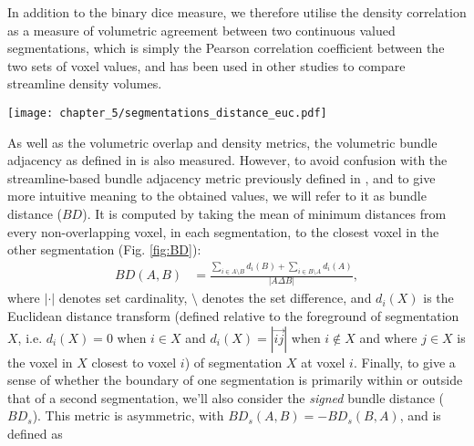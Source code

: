In addition to the binary \gls{dice} measure, we therefore utilise the density correlation as a measure of volumetric agreement between two continuous valued segmentations, which is simply the Pearson correlation coefficient between the two sets of voxel values, and has been used in other studies to compare streamline density volumes\autocite{Radwan2022, Schilling2021a}.

\begin{SCfigure}[50][htbp!]
  \centering
  \texttt{[image: chapter\_5/segmentations\_distance\_euc.pdf]}
  \caption[Bundle distance calculation]{Illustration of regions involved in calculating the bundle distance metric. The light grey area is $A\setminus B$, dark grey is $B\setminus A$, and in each grey voxel is written its minimum Euclidean distance to the black intersection. Distance sign is negative outside of the reference segmentation ($B$ in this example) and positive inside. To compute the bundle distance $BD(A,B)$ (Eq. \ref{eq:bd}), the mean minimum absolute distance is taken across all 17 voxels in the two grey areas $BD(A,B) = (14+4\sqrt{2}+3\sqrt{5})/17 = 1.55$. To compute the signed bundle distance $BD_s(A,B)$ (Eq. \ref{eq:bds}), the signed distances relative to the reference set $B$ are used: $BD_s(A,B) = (2-2\sqrt{2}-\sqrt{5})/17 = -0.18$.
  The  for these two segmentations would be $DSC = 2*4/(13+12) = 0.32$}
  \label{fig:BD}
\end{SCfigure}

As well as the volumetric overlap and density metrics, the volumetric bundle adjacency as defined in \textcite{Schilling2021a} is also measured.
However, to avoid confusion with the streamline-based bundle adjacency\autocite{Radwan2022, Garyfallidis2012, Rheault2022} metric previously defined in \textcite{Garyfallidis2012},
and to give more intuitive meaning to the obtained values, we will refer to it as bundle distance ($BD$).
It is computed by taking the mean of minimum distances from every non-overlapping voxel, in each segmentation, to the closest voxel in the other segmentation (Fig. \ref{fig:BD}):
\begin{align}
  BD(A,B) &= \frac{\sum_{i \in A\setminus B} d_i(B) + \sum_{i \in B\setminus A} d_i(A)}{|A\Delta B|} \label{eq:bd},
\end{align}
where $| \cdot |$ denotes set cardinality, $\setminus$ denotes the set difference, and $d_i(X)$ is the Euclidean distance transform (defined relative to the foreground of segmentation $X$, i.e. $d_i(X) = 0$ when $i \in X $ and $d_i(X) = |\overrightarrow{ij}|$ when $i \not\in X$ and where $j \in X$ is the voxel in $X$ closest to voxel $i$)  of segmentation $X$ at voxel $i$.
Finally, to give a sense of whether the boundary of one segmentation is primarily within or outside that of a second segmentation, we'll also consider the \textit{signed} bundle distance ($BD_s$).
This metric is asymmetric, with $BD_s (A,B) = -BD_s(B,A)$, and is defined as

